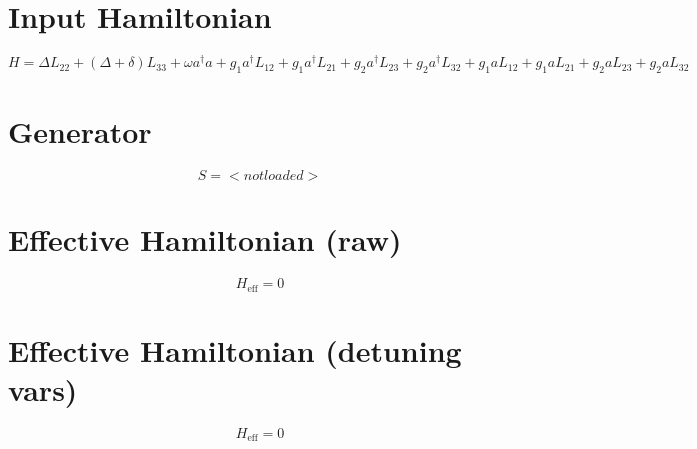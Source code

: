 
\section*{Input Hamiltonian}
\[
H = \Delta L_{22} + (\Delta + \delta) L_{33} + \omega a^{\dagger} a + g_{1} a^{\dagger} L_{12} + g_{1} a^{\dagger} L_{21} + g_{2} a^{\dagger} L_{23} + g_{2} a^{\dagger} L_{32} + g_{1} a L_{12} + g_{1} a L_{21} + g_{2} a L_{23} + g_{2} a L_{32}
\]

\section*{Generator}
\[
S = <not loaded>
\]

\section*{Effective Hamiltonian (raw)}
\[
H_{\mathrm{eff}} = 0
\]

\section*{Effective Hamiltonian (detuning vars)}
\[
H_{\mathrm{eff}} = 0
\]

